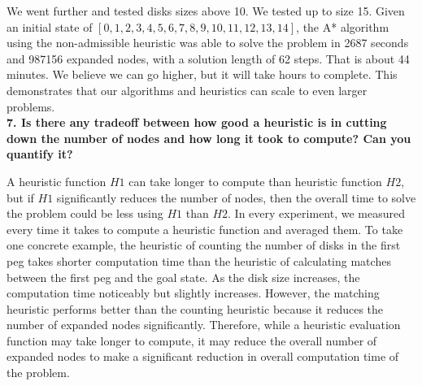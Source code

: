 We went further and tested disks sizes above 10. We tested up to size 15. Given an initial state of $[0,1,2,3,4,5,6,7,8,9,10,11,12,13,14]$, the A* algorithm using the non-admissible heuristic was able to solve the problem in 2687 seconds and 987156 expanded nodes, with a solution length of 62 steps. That is about 44 minutes. We believe we can go higher, but it will take hours to complete. This demonstrates that our algorithms and heuristics can scale to even larger problems.\\

\textbf{7. Is there any tradeoff between how good a heuristic is in cutting down the number of nodes and how long it took to compute? Can you quantify it?}

A heuristic function $H1$ can take longer to compute than heuristic function $H2$, but if $H1$ significantly reduces the number of nodes, then the overall time to solve the problem could be less using $H1$ than $H2$. In every experiment, we measured every time it takes to compute a heuristic function and averaged them. To take one concrete example, the heuristic of counting the number of disks in the first peg takes shorter computation time than the heuristic of calculating matches between the first peg and the goal state. As the disk size increases, the computation time noticeably but slightly increases. However, the matching heuristic performs better than the counting heuristic because it reduces the number of expanded nodes significantly. Therefore, while a heuristic evaluation function may take longer to compute, it may reduce the overall number of expanded nodes to make a significant reduction in overall computation time of the problem.\\

